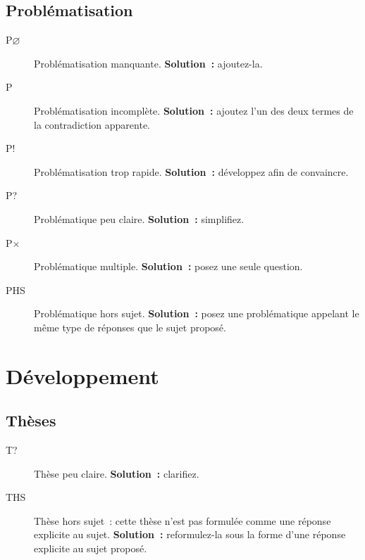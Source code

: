 \documentclass[a4paper,11pt]{article}
\begin{document}
\subsection{Problématisation}
\label{sec:org36ffd3e}
\begin{description}
\item[{P\(\varnothing\)}] Problématisation manquante. \textbf{Solution :} ajoutez-la.
\item[{P\textonehalf}] Problématisation incomplète. \textbf{Solution :} ajoutez
l'un des deux termes de la contradiction apparente.
\item[{P\string!}] Problématisation trop rapide. \textbf{Solution :} développez afin de
convaincre.
\item[{P\string?}] Problématique peu claire. \textbf{Solution :} simplifiez.
\item[{P\(\times\)}] Problématique multiple. \textbf{Solution :} posez une seule
question.
\item[{PHS}] Problématique hors sujet. \textbf{Solution :} posez une problématique
appelant le même type de réponses que le sujet proposé.
\end{description}

\section{Développement}
\label{sec:org44788d3}

\subsection{Thèses}
\label{sec:org3f84152}
\begin{description}
\item[{T\string?}] Thèse peu claire. \textbf{Solution :} clarifiez.
\item[{THS}] Thèse hors sujet : cette thèse n'est pas formulée comme une
réponse explicite au sujet. \textbf{Solution :} reformulez-la sous la forme
d'une réponse explicite au sujet proposé.
\end{description}
\end{document}
